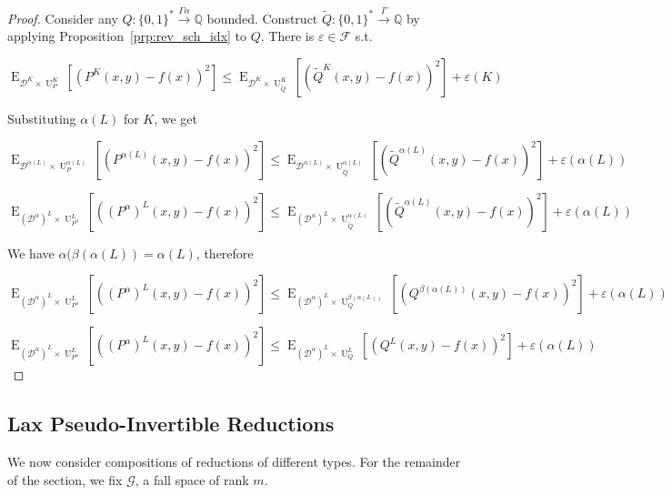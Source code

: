 \documentclass[11pt]{article}
\numberwithin{equation}{section}
\theoremstyle{definition}
\theoremstyle{plain}
\newcommand{\Bool}{\{0,1\}}
\newcommand{\Words}{{\Bool^*}}
\DeclareMathOperator{\E}{E}
\DeclareMathOperator{\Un}{U}
\newcommand{\Rats}{\mathbb{Q}}
\newcommand{\Dist}{\mathcal{D}}
\newcommand{\Fall}{\mathcal{F}}
\newcommand{\Scheme}{\xrightarrow{\Gamma}}
\begin{document}
\begin{proof}

Consider any ${Q: \Words \xrightarrow{\Gamma \alpha} \Rats}$ bounded. Construct ${\tilde{Q}: \Words \Scheme \Rats}$ by applying Proposition~\ref{prp:rev_sch_idx} to ${Q}$. There is ${\varepsilon \in \Fall}$ s.t.

\[\E_{\Dist^{K} \times \Un_P^K}[(P^K(x,y)-f(x))^2] \leq \E_{\Dist^{K} \times \Un_{\tilde{Q}}^K}[(\tilde{Q}^K(x,y)-f(x))^2] + \varepsilon(K)\]

Substituting ${\alpha(L)}$ for ${K}$, we get

\[\E_{\Dist^{\alpha(L)} \times \Un_P^{\alpha(L)}}[(P^{\alpha(L)}(x,y)-f(x))^2] \leq \E_{\Dist^{\alpha(L)} \times \Un_{\tilde{Q}}^{\alpha(L)}}[(\tilde{Q}^{\alpha(L)}(x,y)-f(x))^2] + \varepsilon({\alpha(L)})\]

\[\E_{(\Dist^\alpha)^{L} \times \Un_{P^\alpha}^L}[((P^\alpha)^L(x,y)-f(x))^2] \leq \E_{(\Dist^\alpha)^{L} \times \Un_{\tilde{Q}}^{\alpha(L)}}[(\tilde{Q}^{\alpha(L)}(x,y)-f(x))^2] + \varepsilon(\alpha(L))\]

We have ${\alpha(\beta(\alpha(L))=\alpha(L)}$, therefore

\[\E_{(\Dist^\alpha)^{L} \times \Un_{P^\alpha}^L}[((P^\alpha)^L(x,y)-f(x))^2] \leq \E_{(\Dist^\alpha)^{L} \times \Un_Q^{\beta(\alpha(L))}}[(Q^{\beta(\alpha(L))}(x,y)-f(x))^2] + \varepsilon(\alpha(L))\]

\[\E_{(\Dist^\alpha)^{L} \times \Un_{P^\alpha}^L}[((P^\alpha)^L(x,y)-f(x))^2] \leq \E_{(\Dist^\alpha)^{L} \times \Un_Q^L}[(Q^L(x,y)-f(x))^2] + \varepsilon(\alpha(L))\]
%
\end{proof}

\subsection{Lax Pseudo-Invertible Reductions}

We now consider compositions of reductions of different types. For the remainder of the section, we fix ${\mathcal{G}}$, a fall space of rank ${m}$. 
\end{document}
